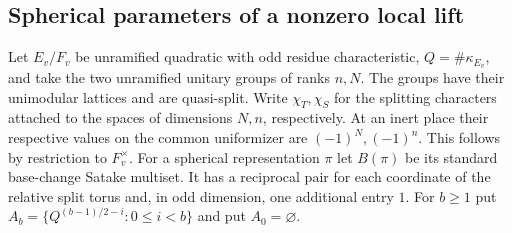 \documentclass[a4paper,11pt]{article}
\theoremstyle{definition}
\theoremstyle{remark}
\numberwithin{equation}{section}
\begin{document}
\subsection{Spherical parameters of a nonzero local lift}\label{nav:VIII-05}
\label{sec:transfer175}

Let \(E_v/F_v\) be unramified quadratic with odd residue
characteristic, \(Q=\#\kappa_{E_v}\), and take the two
unramified unitary groups of ranks \(n,N\). The groups have
their unimodular lattices and are quasi-split. Write
\(\chi_T,\chi_S\) for the splitting characters attached to
the spaces of dimensions \(N,n\), respectively. At an inert
place their respective values on the common uniformizer are
\((-1)^N,(-1)^n\). This follows by restriction to \(F_v^\times\).
For a spherical representation \(\pi\) let \(B(\pi)\) be
its standard base-change Satake multiset. It has a reciprocal
pair for each coordinate of the relative split torus and,
in odd dimension, one additional entry \(1\). For \(b\ge1\)
put \(A_b=\{Q^{(b-1)/2-i}:0\le i<b\}\) and put \(A_0=\varnothing\).
\end{document}
